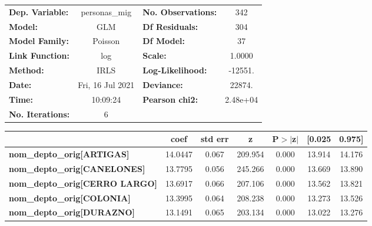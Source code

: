 \begin{center}
\begin{tabular}{lclc}
\toprule
\textbf{Dep. Variable:}                    &  personas\_mig   & \textbf{  No. Observations:  } &      342    \\
\textbf{Model:}                            &       GLM        & \textbf{  Df Residuals:      } &      304    \\
\textbf{Model Family:}                     &     Poisson      & \textbf{  Df Model:          } &       37    \\
\textbf{Link Function:}                    &       log        & \textbf{  Scale:             } &    1.0000   \\
\textbf{Method:}                           &       IRLS       & \textbf{  Log-Likelihood:    } &   -12551.   \\
\textbf{Date:}                             & Fri, 16 Jul 2021 & \textbf{  Deviance:          } &    22874.   \\
\textbf{Time:}                             &     10:09:24     & \textbf{  Pearson chi2:      } &  2.48e+04   \\
\textbf{No. Iterations:}                   &        6         & \textbf{                     } &             \\
\bottomrule
\end{tabular}
\begin{tabular}{lcccccc}
                                           & \textbf{coef} & \textbf{std err} & \textbf{z} & \textbf{P$> |$z$|$} & \textbf{[0.025} & \textbf{0.975]}  \\
\midrule
\textbf{nom\_depto\_orig[ARTIGAS]}         &      14.0447  &        0.067     &   209.954  &         0.000        &       13.914    &       14.176     \\
\textbf{nom\_depto\_orig[CANELONES]}       &      13.7795  &        0.056     &   245.266  &         0.000        &       13.669    &       13.890     \\
\textbf{nom\_depto\_orig[CERRO LARGO]}     &      13.6917  &        0.066     &   207.106  &         0.000        &       13.562    &       13.821     \\
\textbf{nom\_depto\_orig[COLONIA]}         &      13.3995  &        0.064     &   208.238  &         0.000        &       13.273    &       13.526     \\
\textbf{nom\_depto\_orig[DURAZNO]}         &      13.1491  &        0.065     &   203.134  &         0.000        &       13.022    &       13.276     \\

\end{tabular}
\end{center}
